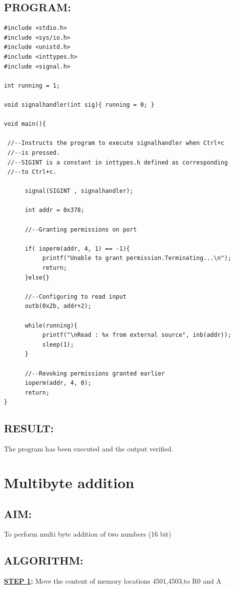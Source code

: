\documentclass[a4paper,28pt,twoside,openright]{report}
\begin{document}
\section*{PROGRAM:}
\begin{lstlisting}
#include <stdio.h>
#include <sys/io.h>
#include <unistd.h>
#include <inttypes.h>
#include <signal.h>

int running = 1;

void signalhandler(int sig){ running = 0; }

void main(){

 //--Instructs the program to execute signalhandler when Ctrl+c
 //--is pressed.
 //--SIGINT is a constant in inttypes.h defined as corresponding
 //--to Ctrl+c.
 
      signal(SIGINT , signalhandler);
      
      int addr = 0x378;
      
      //--Granting permissions on port
      
      if( ioperm(addr, 4, 1) == -1){
           printf("Unable to grant permission.Terminating...\n");
           return;
      }else{}
      
      //--Configuring to read input
      outb(0x2b, addr+2);
      
      while(running){
           printf("\nRead : %x from external source", inb(addr));
           sleep(1);
      }
      
      //--Revoking permissions granted earlier
      ioperm(addr, 4, 0);
      return;
}
\end{lstlisting}

\section*{RESULT:}
The program has been executed and the output verified.
%
%
\newpage
\chapter{Multibyte addition}
%
%
\section*{AIM:}
	To perform multi byte addition of two numbers (16 bit)
	
\section*{ALGORITHM:}
\textbf{\underline{STEP 1}:} Move the content of memory locations 4501,4503,to R0 and A
\end{document}
